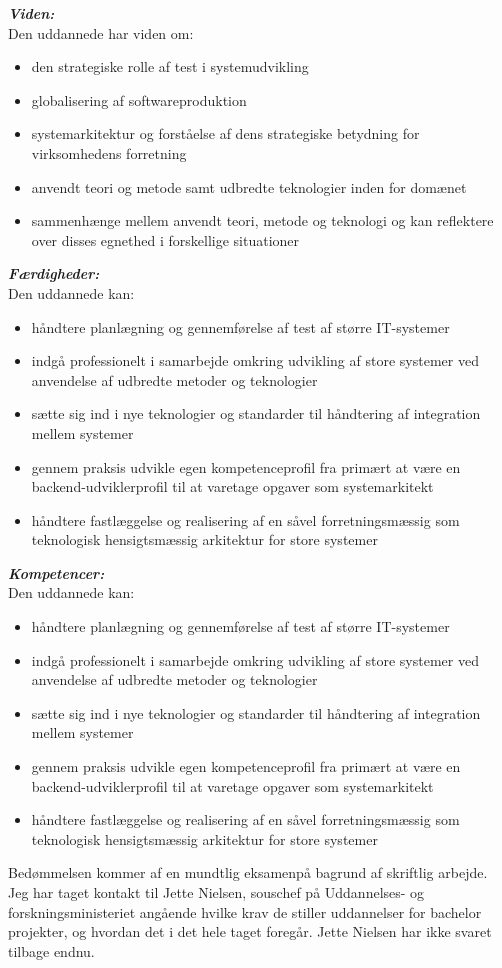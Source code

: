 \documentclass{report}
\begin{document}
\noindent\textbf{\textit{Viden:}}\\
Den uddannede har viden om:
\begin{itemize}
    \item den strategiske rolle af test i systemudvikling
    \item globalisering af softwareproduktion
    \item systemarkitektur og forståelse af dens strategiske betydning for virksomhedens forretning
    \item anvendt teori og metode samt udbredte teknologier inden for domænet
    \item sammenhænge mellem anvendt teori, metode og teknologi og kan reflektere over disses egnethed i forskellige situationer
\end{itemize}
\noindent\textbf{\textit{Færdigheder:}}\\
Den uddannede kan:
\begin{itemize}
    \item håndtere planlægning og gennemførelse af test af større IT-systemer
    \item indgå professionelt i samarbejde omkring udvikling af store systemer ved anvendelse af udbredte metoder og teknologier
    \item sætte sig ind i nye teknologier og standarder til håndtering af integration mellem systemer
    \item gennem praksis udvikle egen kompetenceprofil fra primært at være en backend-udviklerprofil til at varetage opgaver som systemarkitekt
    \item håndtere fastlæggelse og realisering af en såvel forretningsmæssig som teknologisk hensigtsmæssig arkitektur for store systemer
\end{itemize}
\noindent\textbf{\textit{Kompetencer:}}\\
Den uddannede kan:
\begin{itemize}
    \item håndtere planlægning og gennemførelse af test af større IT-systemer
    \item indgå professionelt i samarbejde omkring udvikling af store systemer ved anvendelse af udbredte metoder og teknologier
    \item sætte sig ind i nye teknologier og standarder til håndtering af integration mellem systemer
    \item gennem praksis udvikle egen kompetenceprofil fra primært at være en backend-udviklerprofil til at varetage opgaver som systemarkitekt
    \item håndtere fastlæggelse og realisering af en såvel forretningsmæssig som teknologisk hensigtsmæssig arkitektur for store systemer
\end{itemize}

\noindent Bedømmelsen kommer af en mundtlig eksamenpå bagrund af skriftlig arbejde.\\

\noindent\newline Jeg har taget kontakt til Jette Nielsen, souschef på Uddannelses- og forskningsministeriet angående hvilke krav 
de stiller uddannelser for bachelor projekter, og hvordan det i det hele taget foregår. 
Jette Nielsen har ikke svaret tilbage endnu.
\end{document}
